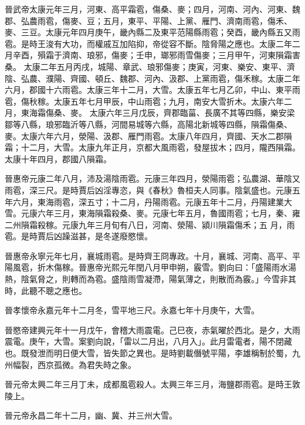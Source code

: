 \begin{pinyinscope}
 晉武帝太康元年三月，河東、高平霜雹，傷桑、麥；四月，河南、河內、河東、魏郡、弘農雨雹，傷麥、豆；五月，東平、平陽、上黨、雁門、濟南雨雹，傷禾、麥、三豆。太康元年四月庚午，畿內縣二及東平范陽縣雨雹；癸酉，畿內縣五又雨雹。是時王浚有大功，而權戚互加陷抑，帝從容不斷。陰脅陽之應也。太康二年二月辛酉，殞霜于濟南、琅邪，傷麥；壬申，瑯邪雨雪傷麥；三月甲午，河東隕霜害桑。
 太康二年五月丙戌，城陽、章武、琅邪傷麥；庚寅，河東、樂安、東平、濟陰、弘農、濮陽、齊國、頓丘、魏郡、河內、汲郡、上黨雨雹，傷禾稼。太康二年六月，郡國十六雨雹。太康三年十二月，大雪。太康五年七月乙卯，中山、東平雨雹，傷秋稼。太康五年七月甲辰，中山雨雹；九月，南安大雪折木。太康六年二月，東海霜傷桑、麥。
 太康六年三月戊辰，齊郡臨菑、長廣不其等四縣，樂安梁鄒等八縣，琅邪臨沂等八縣，河間易城等六縣，高陽北新城等四縣，隕霜傷桑、麥。太康六年六月，滎陽、汲郡、雁門雨雹。太康八年四月，齊國、天水二郡隕霜；十二月，大雪。太康九年正月，京都大風雨雹，發屋拔木；四月，隴西隕霜。太康十年四月，郡國八隕霜。



 晉惠帝元康二年八月，沛及湯陰雨雹。元康三年四月，滎陽雨雹；弘農湖、華陰又雨雹，深三尺。是時賈后凶淫專恣，與《春秋》魯桓夫人同事。陰氣盛也。元康五年六月，東海雨雹，深五寸；十二月，丹陽雨雹。元康五年十二月，丹陽建業大雪。元康六年三月，東海隕霜殺桑、麥。元康七年五月，魯國雨雹；七月，秦、雍二州隕霜殺稼。元康九年三月旬有八日，河南、滎陽、潁川隕霜傷禾；五
 月，雨雹。是時賈后凶躁滋甚，是冬遂廢愍懷。



 晉惠帝永寧元年七月，襄城雨雹。是時齊王冏專政。十月，襄城、河南、高平、平陽風雹，折木傷稼。晉惠帝光熙元年閏八月甲申朔，霰雪。劉向曰：「盛陽雨水湯熱，陰氣脅之，則轉而為雹。盛陰雨雪凝滯，陽氣薄之，則散而為霰。」今雪非其時，此聽不聰之應也。



 晉孝懷帝永嘉元年十二月冬，雪平地三尺。永嘉七年十月庚午，大雪。



 晉愍帝建興元年十一月戊午，會稽大雨震電。己巳夜，赤氣曜於西北。是夕，大雨震電。庚午，大雪。案劉向說，「雷以二月出，八月入」。此月雷電者，陽不閉藏也。既發泄而明日便大雪，皆失節之異也。是時劉載僭號平陽，李雄稱制於蜀，九州幅裂，西京孤微。為君失時之象。



 晉元帝太興二年三月丁未，成都風雹殺人。太興三年三月，海鹽郡雨雹。是時王敦陵上。



 晉元帝永昌二年十二月，幽、冀、并三州大雪。




\end{pinyinscope}
